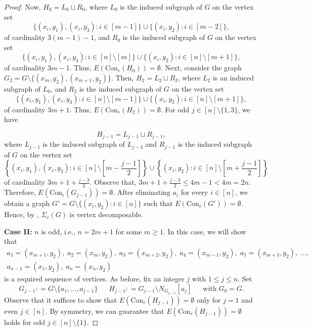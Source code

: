 \documentclass[12pt,reqno]{amsart}
\theoremstyle{definition}
\newcommand{\Con}{{\mathrm{Con}}}
\begin{document}
\begin{proof}
		Now, $H_0 = L_0 \sqcup R_0$, where $L_0$ is the induced subgraph of $G$ on the vertex set 
        \[
        \{(x_i,y_1), (x_i,y_3) : i \in [m-1]\} \cup \{(x_i,y_2) : i \in [m-2]\},
        \]
        of cardinality $3(m-1) -1$, and $R_0$ is the induced subgraph of $G$ on the vertex set 
        \[
        \{(x_i,y_1), (x_i,y_3) : i \in [n] \setminus [m]\} \cup \{(x_i,y_2) : i \in [n] \setminus [m+1]\},
        \]
        of cardinality $3m-1$. Thus, $E(\Con_r(H_{0})) = \emptyset$. Next, consider the graph $G_2 = G \setminus \{(x_m,y_2),(x_{m+1},y_2)\}$. Then, $H_2 = L_2 \sqcup R_2$, where $L_2$ is an induced subgraph of $L_0$, and $R_2$ is the induced subgraph of $G$ on the vertex set 
        \[
        \{(x_i,y_1), (x_i,y_3) : i \in [n] \setminus [m-1]\} \cup \{(x_i,y_2) : i \in [n] \setminus [m+1]\},
        \]
        of cardinality $3m+1$. Thus, $E(\Con_r(H_{2})) = \emptyset$. For odd $j \in [n] \setminus \{1,3\}$, we have
		
		\[H_{j-1} = L_{j-1} \sqcup R_{j-1},\]
		where $L_{j-1}$ is the induced subgraph of $L_{j-3}$ and $R_{j-1}$ is the induced subgraph of $G$  on the vertex set 
        \[
        \left\{(x_i,y_1), (x_i,y_3) : i \in [n] \setminus \left[m-\frac{j-1}{2}\right]\right\} \cup \left\{(x_i,y_2) : i \in [n] \setminus \left[m+\frac{j-1}{2}\right]\right\}
        \]
        of cardinality $3m+1+\frac{j-3}{2}$. Observe that, $3m+1+\frac{j-3}{2} \le 4m -1 < 4m = 2n$. Therefore, $E(\Con_r(G_{j-1})) = \emptyset$. After eliminating $a_i$ for every $i \in [n]$, we obtain a graph $G'=G \setminus \{(x_i,y_2): i\in[n]\}$ such that $E(\Con_r(G'))=\emptyset$. Hence, by , $\Sigma_r(G)$ is vertex decomposable.
		
		\medskip
		\noindent 
		\textbf{Case II:} $n$ is odd, i.e., $n=2m+1$ for some $m \geq 1$.  In this case, we will show that 
        \begin{multline*}
a_1 = (x_{m+1}, y_2),\; a_2 = (x_{m}, y_2),\; a_3 = (x_{m+2}, y_2),\; 
a_4 = (x_{m-1}, y_2),\; a_5 = (x_{m+3}, y_2),\; \ldots,\\
a_{n-1} = (x_1, y_2),\; a_{n} = (x_n, y_2)
\end{multline*}
is a required sequence of vertices. As before, fix an integer $j$ with $1 \leq j \leq n$. Set 
		\[G_{j-1} : = G \setminus \{a_1,\ldots,a_{j-1}\} \; \quad \; H_{j-1} : = G_{j-1} \setminus N_{G_{j-1}}[a_j] \; \quad \; \text{with} \; G_0 = G.\]
		Observe that it suffices to show that $E(\Con_r(H_{j-1})) = \emptyset$ only for $j=1$ and even $j \in [n]$. By symmetry, we can guarantee that $E(\Con_r(H_{j-1})) = \emptyset$ holds for odd $j \in [n] \setminus \{1\}$. 
		

\end{proof}
\end{document}
